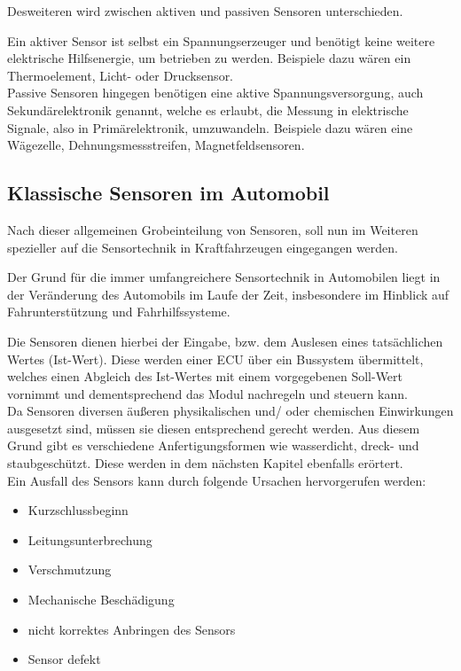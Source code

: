 	                	Desweiteren wird zwischen aktiven und passiven Sensoren unterschieden. 
	                	
	                	Ein aktiver Sensor ist selbst ein Spannungserzeuger und benötigt keine weitere elektrische Hilfsenergie, um betrieben zu werden. Beispiele dazu wären ein Thermoelement, Licht- oder Drucksensor.\\
	                	
	                	Passive Sensoren hingegen benötigen eine aktive Spannungsversorgung, auch Sekundärelektronik genannt, welche es erlaubt, die Messung in elektrische Signale, also in Primärelektronik, umzuwandeln. Beispiele dazu wären eine Wägezelle, Dehnungsmessstreifen, Magnetfeldsensoren.		
	                	
	                                        
	\subsection{Klassische Sensoren im Automobil} 
	       
	    Nach dieser allgemeinen Grobeinteilung von Sensoren, soll nun im Weiteren spezieller auf die Sensortechnik in Kraftfahrzeugen eingegangen werden.
	
	    Der Grund für die immer umfangreichere Sensortechnik in Automobilen liegt in der Veränderung des Automobils im Laufe der Zeit, insbesondere im Hinblick auf Fahrunterstützung und Fahrhilfssysteme.
	     	
	    Die Sensoren dienen hierbei der Eingabe,  bzw. dem Auslesen eines tatsächlichen Wertes (Ist-Wert). Diese werden einer ECU über ein Bussystem übermittelt, welches einen Abgleich des Ist-Wertes mit einem vorgegebenen Soll-Wert vornimmt und dementsprechend das Modul nachregeln und steuern kann. \\ 
	    
	    Da Sensoren diversen äußeren physikalischen und/ oder chemischen Einwirkungen ausgesetzt sind, müssen sie diesen entsprechend gerecht werden. Aus diesem Grund gibt es verschiedene Anfertigungsformen wie wasserdicht, dreck- und staubgeschützt. Diese werden in dem nächsten Kapitel ebenfalls erörtert.\\  
	            
	    Ein Ausfall des Sensors kann durch folgende Ursachen hervorgerufen werden:
	
	        \begin{itemize}
	            \item Kurzschlussbeginn
	            \item Leitungsunterbrechung
	            \item Verschmutzung
	            \item Mechanische Beschädigung
	            \item nicht korrektes Anbringen des Sensors
	            \item Sensor defekt
	        \end{itemize}	
	        
